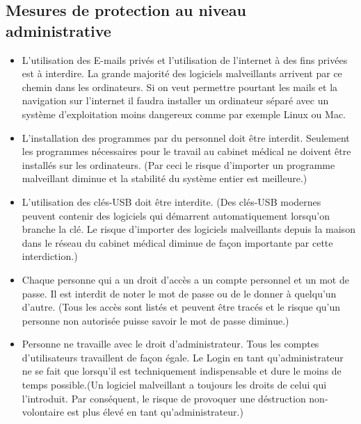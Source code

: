 \documentclass[a4paper]{scrartcl}
\begin{document}
\subsection{Mesures de protection au niveau administrative}
\begin{itemize}
\item     L'utilisation des E-mails privés et l'utilisation de l'internet à des fins privées est à interdire.  La grande majorité des logiciels malveillants arrivent par ce chemin dans les ordinateurs. Si on veut permettre pourtant les mails et la navigation sur l'internet il faudra installer un ordinateur séparé avec un système d'exploitation moins dangereux comme par exemple Linux ou Mac.

\item L'installation des programmes par du personnel doit être interdit. Seulement les programmes nécessaires pour le travail au cabinet médical ne doivent être installés sur les ordinateurs. (Par ceci le risque d'importer un programme malveillant diminue et la stabilité du système entier est meilleure.)

\item L'utilisation des clés-USB doit être interdite. (Des clés-USB modernes peuvent contenir des logiciels qui démarrent automatiquement lorsqu'on branche la clé. Le risque d'importer des logiciels malveillants depuis la maison dans le réseau du cabinet médical diminue de façon importante par cette interdiction.)

    \item Chaque personne qui a un droit d'accès a un compte personnel et un mot de passe. Il est interdit de noter le mot de passe ou de le donner à quelqu'un d'autre. (Tous les accès sont listés et peuvent être tracés et le risque qu'un personne non autorisée puisse savoir le mot de passe diminue.)
    \item Personne ne travaille avec le droit d'administrateur. Tous les comptes d'utilisateurs travaillent de façon égale. Le Login en tant qu'administrateur ne se fait que lorsqu'il est techniquement indispensable et dure le moins de temps possible.(Un logiciel malveillant a toujours les droits de celui qui l'introduit. Par conséquent, le risque de provoquer une déstruction non-volontaire est plus élevé en tant qu'administrateur.)

\end{itemize}
\end{document}
